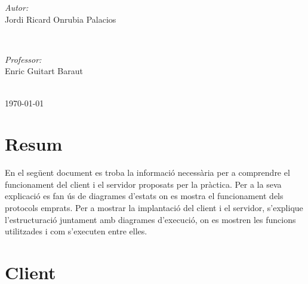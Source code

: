 \documentclass[11pt]{article}
\begin{document}
\begin{titlepage}
\begin{minipage}{0.4\textwidth}
\begin{flushleft} \large
\emph{Autor:}\\
Jordi Ricard Onrubia Palacios %
\end{flushleft}
\end{minipage}
~
\begin{minipage}{0.4\textwidth}
\begin{flushright} \large
\emph{Professor:} \\
Enric Guitart Baraut %
\end{flushright}
\end{minipage}\\[4cm]

{\large \today}\\[3cm] %
\vfill %
\end{titlepage}

\newpage
\section*{Resum}
En el següent document es troba la informació necessària per a comprendre el funcionament del client i el servidor proposats per la pràctica. Per a la seva explicació es fan ús de diagrames d'estats on es mostra el funcionament dels protocols emprats. Per a mostrar la implantació del client i el servidor, s'explique l'estructuració juntament amb diagrames d'execució, on es mostren les funcions utilitzades i com s'executen entre elles.
\justify
\thispagestyle{empty}
\newpage
\thispagestyle{empty}
\tableofcontents
\newpage
\clearpage
{}
\section{Client}
\end{document}
